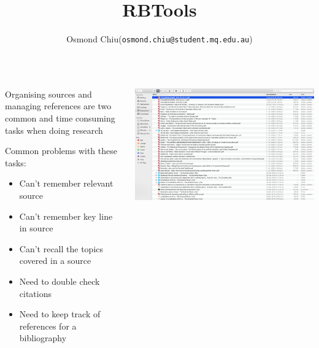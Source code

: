 \documentclass[unknownkeysallowed,usepdftitle=false, parskip=full, aspectratio-1610]{beamer}
\title{RBTools}
\author{Osmond Chiu\inst (\texttt{osmond.chiu@student.mq.edu.au})}
\institute{Macquarie University}
\newcommand{\secvariable}{nothing}
\newcommand{\mysection}[1]{\renewcommand{\secvariable}{#1}
}
\begin{document}
\mysection{abstract}
\begin{frame}\label{\secvariable}



\parbox{\linewidth}{

\begin{columns}[t]
    \begin{column}[c]{0.5\textwidth}

Organising sources and managing references are two common and time consuming tasks when doing research

 \vspace{12pt}

Common problems with these tasks:
\begin{itemize}
\item Can't remember relevant source
\item Can't remember key line in source
\item Can't recall the topics covered in a source
\item Need to double check citations
\item Need to keep track of references for a bibliography
\end{itemize}

 \end{column}
    \begin{column}[c]{0.5\textwidth}
\includegraphics[width=1\textwidth,height=0.5\textheight,keepaspectratio]{pdf.png}\\

 \vspace{12pt}


 
   \end{column}
  \end{columns}

}

   
\end{frame}
\end{document}

